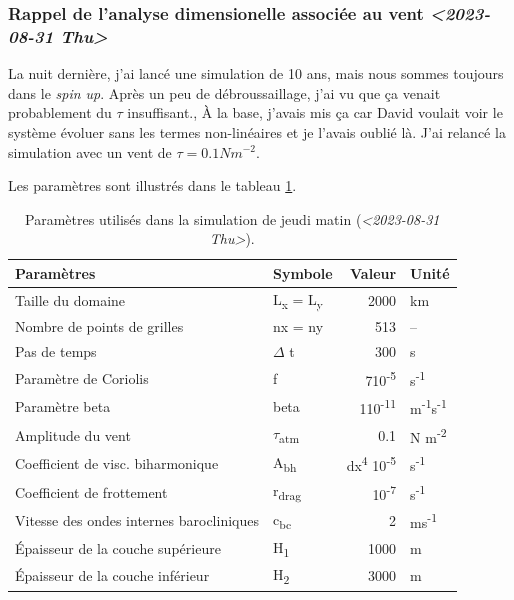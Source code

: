 \documentclass[10pt]{article}
\numberwithin{equation}{section}
\begin{document}
\subsubsection{Rappel de l'analyse dimensionelle associée au vent \textit{<2023-08-31 Thu>}}
\label{sec:org6732d23}
La nuit dernière, j'ai lancé une simulation de 10 ans, mais nous sommes toujours dans le \emph{spin up}.
Après un peu de débroussaillage, j'ai vu que ça venait probablement du \(\tau\) insuffisant.,
À la base, j'avais mis ça car David voulait voir le système évoluer sans les termes non-linéaires et je l'avais oublié là.
J'ai relancé la simulation avec un vent de \(\tau = 0.1 Nm^{-2}\).\bigskip

Les paramètres sont illustrés dans le tableau \ref{tab:org2dc16e9}.

\begin{table}[htbp]
\caption{\label{tab:org2dc16e9}Paramètres utilisés dans la simulation de jeudi matin (\textit{<2023-08-31 Thu>}).}
\centering
\begin{tabular}{llrl}
\hline
\hline
Paramètres & Symbole & Valeur & Unité\\
\hline
Taille du domaine & L\textsubscript{x} = L\textsubscript{y} & 2000 & km\\
Nombre de points de grilles & nx = ny & 513 & --\\
Pas de temps & \(\Delta\) t & 300 & s\\
Paramètre de Coriolis & f & 7\texttimes{}10\textsuperscript{-5} & s\textsuperscript{-1}\\
Paramètre beta & beta & 1\texttimes{}10\textsuperscript{-11} & m\textsuperscript{-1}s\textsuperscript{-1}\\
Amplitude du vent & \(\tau\)\textsubscript{atm} & 0.1 & N m\textsuperscript{-2}\\
Coefficient de visc. biharmonique & A\textsubscript{bh} & dx\textsuperscript{4} \texttimes{}10\textsuperscript{-5} & s\textsuperscript{-1}\\
Coefficient de frottement & r\textsubscript{drag} & 10\textsuperscript{-7} & s\textsuperscript{-1}\\
Vitesse des ondes internes barocliniques & c\textsubscript{bc} & 2 & ms\textsuperscript{-1}\\
Épaisseur de la couche supérieure & H\textsubscript{1} & 1000 & m\\
Épaisseur de la couche inférieur & H\textsubscript{2} & 3000 & m\\
\hline
\end{tabular}
\end{table}
\end{document}
